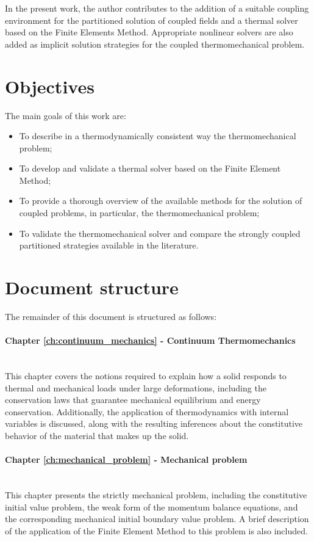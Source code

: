 In the present work, the author contributes to the addition of a suitable coupling environment for the partitioned solution of coupled fields and a thermal solver based on the Finite Elements Method.
Appropriate nonlinear solvers are also added as implicit solution strategies for the coupled thermomechanical problem.

\section{Objectives}

The main goals of this work are:
\begin{itemize}
    \item To describe in a thermodynamically consistent way the thermomechanical problem;
    \item To develop and validate a thermal solver based on the Finite Element Method;
    \item To provide a thorough overview of the available methods for the solution of coupled problems, in particular, the thermomechanical problem;
    \item To validate the thermomechanical solver and compare the strongly coupled partitioned strategies available in the literature.
\end{itemize}

\section{Document structure}

The remainder of this document is structured as follows:

\paragraph{Chapter \ref{ch:continuum_mechanics} - Continuum Thermomechanics}\mbox{}\\
This chapter covers the notions required to explain how a solid responds to thermal and mechanical loads under large deformations, including the conservation laws that guarantee mechanical equilibrium and energy conservation.
Additionally, the application of thermodynamics with internal variables is discussed, along with the resulting inferences about the constitutive behavior of the material that makes up the solid.

\paragraph{Chapter \ref{ch:mechanical_problem} - Mechanical problem}\mbox{}\\
This chapter presents the strictly mechanical problem, including the constitutive initial value problem, the weak form of the momentum balance equations, and the corresponding mechanical initial boundary value problem.
A brief description of the application of the Finite Element Method to this problem is also included.

